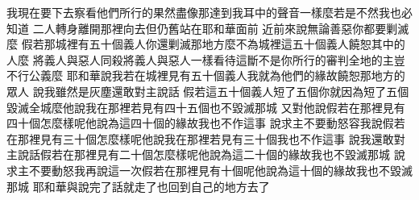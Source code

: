 我現在要下去\chientien 察看他們所行的\chientien 果然盡像那達到我耳中的聲音一樣麼\yuentien 若是不然\chientien 我也必知道\chuan\Chuan
{}二人轉身離開那裡\chientien 向去\chientien 但仍舊站在耶和華面前\chuan 
{}近前來說\chientien 無論善惡\chientien 你都要剿滅麼\chuan 
{}假若那城裡有五十個義人\chientien 你還剿滅那地方麼\chuan 不為城裡這五十個義人饒恕其中的人麼\chuan 
{}將義人與惡人同殺\chientien 將義人與惡人一樣看待\chientien 這斷不是你所行的\yuentien 審判全地的主\chientien 豈不行公義麼\chuan 
{}耶和華說\chientien 我若在城裡見有五十個義人\chientien 我就為他們的緣故\chientien 饒恕那地方的眾人\chuan 
{}說\chientien 我雖然是灰塵\chientien 還敢對主說話\yuentien 
{}假若這五十個義人短了五個\chientien 你就因為短了五個毀滅全城麼\yuentien 他說\chientien 我在那裡若見有四十五個\chientien 也不毀滅那城\chuan 
{}又對他說\chientien 假若在那裡見有四十個怎麼樣呢\yuentien 他說\chientien 為這四十個的緣故\chientien 我也不作這事\chuan 
{}說\chientien 求主不要動怒\chientien 容我說\yuentien 假若在那裡見有三十個怎麼樣呢\yuentien 他說\chientien 我在那裡若見有三十個\chientien 我也不作這事\chuan 
{}說\chientien 我還敢對主說話\chientien 假若在那裡見有二十個怎麼樣呢\yuentien 他說\chientien 為這二十個的緣故\chientien 我也不毀滅那城\chuan 
{}說\chientien 求主不要動怒\chientien 我再說這一次\chientien 假若在那裡見有十個呢\yuentien 他說\chientien 為這十個的緣故\chientien 我也不毀滅那城\chuan 
{}耶和華與說完了話就走了\yuentien{}也回到自己的地方去了\chuan 
